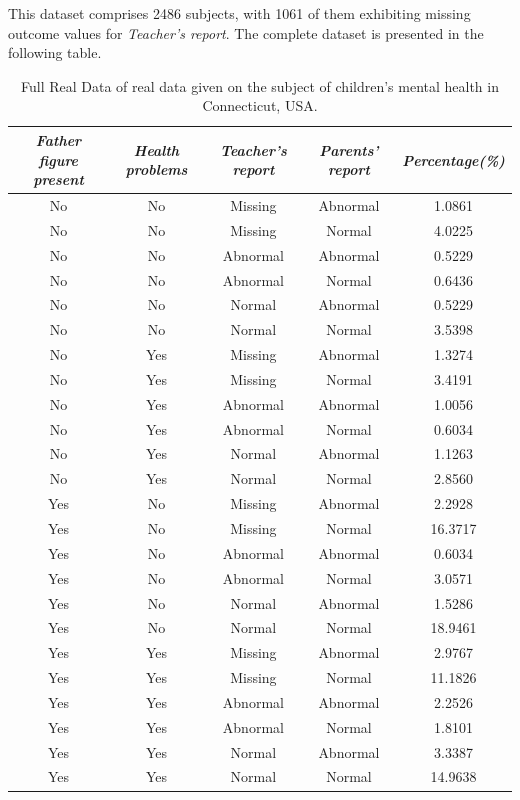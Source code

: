\documentclass{article}
\theoremstyle{plain}
\theoremstyle{definition}
\theoremstyle{remark}
\begin{document}
This dataset comprises 2486 subjects, with 1061 of them exhibiting missing outcome values for \textit{Teacher's report}. The complete dataset is presented in the following table.
\begin{table}[htbp]
    \centering
    \caption{Full Real Data of real data given on the
subject of children’s mental health in Connecticut, USA.}
    \vskip 0.15in
    \begin{sc}
    \begin{small}
    \begin{tabular}{ccccc}
    
     \toprule
     \textit{Father figure present} & \textit{Health problems} & \textit{Teacher's report} &  \textit{Parents' report} & \textit{Percentage(\%)} \\
     \midrule
     No & No & Missing  & Abnormal & 1.0861 \\
     No & No & Missing  & Normal & 4.0225 \\
     No & No & Abnormal  & Abnormal & 0.5229 \\
     No & No & Abnormal  & Normal & 0.6436 \\
     No & No & Normal  & Abnormal & 0.5229 \\
     No & No & Normal  & Normal & 3.5398 \\
     No & Yes & Missing  & Abnormal & 1.3274 \\ 
     No & Yes & Missing  & Normal & 3.4191  \\
     No & Yes & Abnormal  & Abnormal & 1.0056 \\
     No & Yes & Abnormal  & Normal & 0.6034 \\
     No & Yes & Normal  & Abnormal & 1.1263 \\
     No & Yes & Normal  & Normal & 2.8560 \\
     Yes & No & Missing  & Abnormal & 2.2928 \\
     Yes & No & Missing  & Normal & 16.3717 \\
     Yes & No & Abnormal  & Abnormal & 0.6034 \\
     Yes & No & Abnormal  & Normal & 3.0571 \\
     Yes & No & Normal  & Abnormal & 1.5286 \\
     Yes & No & Normal  & Normal & 18.9461 \\
     Yes & Yes & Missing  & Abnormal & 2.9767 \\
     Yes & Yes & Missing  & Normal & 11.1826 \\
     Yes & Yes & Abnormal  & Abnormal & 2.2526 \\
     Yes & Yes & Abnormal  & Normal & 1.8101 \\
     Yes & Yes & Normal  & Abnormal & 3.3387 \\
     Yes & Yes & Normal  & Normal & 14.9638 \\
     \bottomrule
    \end{tabular}
    \end{small}
    \end{sc}
    \label{full_real_data}
\end{table}
\fi
\end{document}
